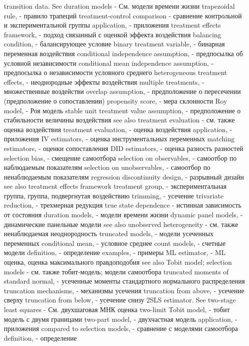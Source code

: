 transition data. See duration models - См. модели времени жизни
trapezoidal rule, - правило трапеций
treatment-control comparison - сравнение контрольной и экспериментальной группы
application, - приложения
treatment effects framework, - подход связанный с оценкой эффекта воздействия
balancing condition,  - балансирующее условие
binary treatment variable, - бинарная переменная воздействия
conditional independence assumption, - предпосылка об условной независимости
conditional mean independence assumption, - предпосылка о независимости условного среднего
heterogeneous treatment effects, - неоднородные эффекты воздействия
multiple treatments, - множественные воздействи
overlap assumption, - предположение о пересечении (предположение о сопоставлении)
propensity score, - мера склонности
Roy model, - Роя модель
stable unit treatment value assumption, - предположение о стабильности величины воздействия
see also treatment evaluation - см. также оценка воздействия
treatment evaluation, - оценка воздействия
application, - приложения
IV estimators, - оценка инструментальных переменных
matching estimators, - оценки сопоставления
DID estimators, - оценка разность разностей
selection bias, - смещение самоотбора
selection on observables, - самоотбор по наблюдаемым показателям
selection on unobservables, - самоотбор по ненаблюдаемым показателям
regression discontinuity design, - разрывный дизайн
see also treatment effects framework 
treatment group, - экспериментальная группа, группа, подвергнутая воздействию
trimming, - усечение
trivariate reduction, - трехмерная редукция
true state dependence - истинная зависимость от состояния
duration models, - модели времени жизни
dynamic panel models, - динамические панельные модели
see also unobserved heterogeneity - см. также ненаблюдаемая неоднородность
truncated models, - модели усеченных переменных
conditional mean, - условное среднее
count models, - счетные модели
definition, - определение
examples, - примеры
ML estimator, - ML оценка, оценка максимального правдоподобия
see also Tobit model; selection models - см. также тобит-модель; модели самоотбора
truncated moments of standard normal, - усеченные моменты стандартного нормального распределения
truncation mechanisms, - механизмы усечения
truncation from above, - усечение сверху
truncation from below, - усечение снизу
2SLS estimator. See two-stage least squares - См. двухшаговая МНК оценка
two-limit Tobit model, - тобит модель с двумя границами
two-part model, - двухчастная модель
application, - приложения
compared to selection models, - сравнение с моделями самоотбора
definition, - определение
